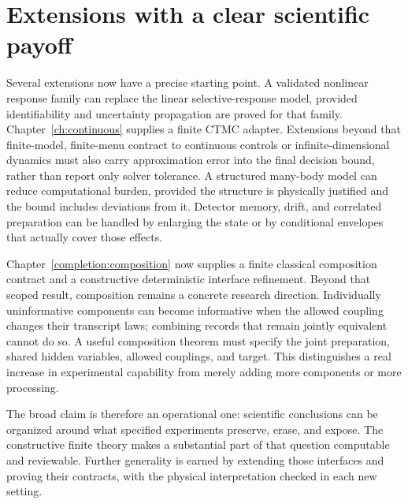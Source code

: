 \section{Extensions with a clear scientific payoff}

Several extensions now have a precise starting point. A validated nonlinear
response family can replace the linear selective-response model, provided
identifiability and uncertainty propagation are proved for that family.
Chapter~\ref{ch:continuous} supplies a finite CTMC adapter. Extensions
beyond that finite-model, finite-menu contract to continuous controls or
infinite-dimensional dynamics must also carry approximation error into
the final decision bound, rather than report only solver tolerance. A structured many-body
model can reduce computational burden, provided the structure is physically
justified and the bound includes deviations from it. Detector memory, drift,
and correlated preparation can be handled by enlarging the state or by
conditional envelopes that actually cover those effects.

Chapter~\ref{completion:composition} now supplies a finite classical composition contract and a constructive deterministic interface refinement. Beyond that scoped result, composition remains a concrete research direction. Individually
uninformative components can become informative when the allowed coupling
changes their transcript laws; combining records that remain jointly
equivalent cannot do so. A useful composition theorem must specify the joint
preparation, shared hidden variables, allowed couplings, and target. This
distinguishes a real increase in experimental capability from merely adding
more components or more processing.

The broad claim is therefore an operational one: scientific conclusions can
be organized around what specified experiments preserve, erase, and expose.
The constructive finite theory makes a substantial part of that question
computable and reviewable. Further generality is earned by extending those
interfaces and proving their contracts, with the physical interpretation
checked in each new setting.
